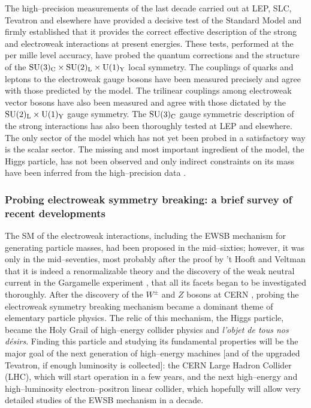 The high--precision measurements of the last decade \cite{High-Precision,PDG}
carried out at LEP, SLC, Tevatron and elsewhere have provided a decisive test
of the Standard Model and firmly established that it provides the correct
effective description of the strong and electroweak interactions at present
energies. These tests, performed at the per mille level accuracy, have probed
the quantum corrections and the structure of the ${\rm SU(3)_C\times SU(2)_L
\times U(1)_Y}$ local symmetry.  The couplings of quarks and leptons to the
electroweak gauge bosons have been measured precisely and agree with those
predicted by the model. The trilinear couplings among electroweak vector bosons
have also been measured and agree with those dictated by the ${\rm
SU(2)_L\times U(1)_Y}$ gauge symmetry. The ${\rm SU(3)_C}$ gauge symmetric
description of the strong interactions has also been thoroughly tested at LEP
and elsewhere.  The only sector of the model which has not yet been probed in a
satisfactory way is the scalar sector. The missing and most important
ingredient of the model, the Higgs particle, has not been observed
\cite{PDG,LEP2-Higgs-exp} and only indirect constraints on its mass have
been inferred from the high--precision data \cite{High-Precision}.\s

\subsubsection*{Probing electroweak symmetry breaking: a brief survey of recent
developments} 

The SM of the electroweak interactions, including the EWSB mechanism for
generating particle masses, had been proposed in the mid--sixties; however, it
was only in the mid--seventies, most probably after the proof by 't Hooft and
Veltman that it is indeed a renormalizable theory \cite{RENORM} and the
discovery of the weak neutral current in the Gargamelle experiment
\cite{Gargamelle}, that all its facets began to be investigated thoroughly. 
After the discovery of the $W^\pm$ and $Z$ bosons at CERN \cite{WZ-Discovery},
probing the electroweak symmetry breaking  mechanism became a dominant theme of
elementary particle physics. The relic of this mechanism, the Higgs particle,
became the Holy Grail of high--energy collider physics and {\it l'objet de tous
nos d\'esirs}. Finding this particle and studying its fundamental properties
will be the major goal of the next generation of high--energy machines [and of
the upgraded Tevatron, if enough lumino\-sity is collected]: the CERN Large
Hadron Collider (LHC), which will start operation in a few years, and the next
high--energy and high--luminosity electron--positron linear collider, which
hopefully will allow very detailed studies of the EWSB mechanism in a decade.\s
 
